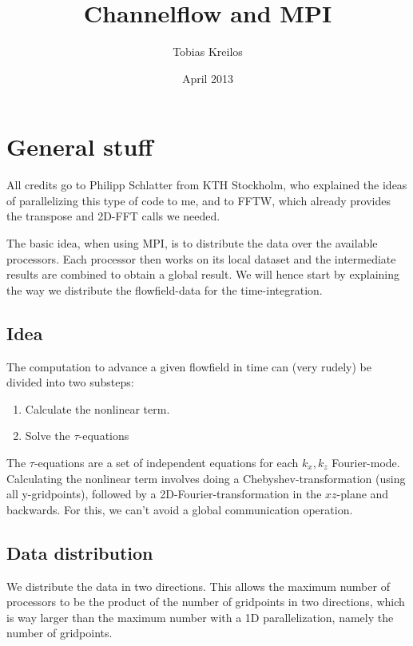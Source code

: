 \documentclass[a4paper,10pt,DIV=16]{scrartcl}
\title{Channelflow and MPI}
\author{Tobias Kreilos}
\date{April 2013}
\begin{document}
\maketitle

\section{General stuff}

	All credits go to Philipp Schlatter from KTH Stockholm, who explained the ideas of parallelizing this type of code to me, and to FFTW, which already provides the transpose and 2D-FFT calls we needed.

	The basic idea, when using MPI, is to distribute the data over the available processors. Each processor then works on its local dataset and the intermediate results are combined to obtain a global result.
	We will hence start by explaining the way we distribute the flowfield-data for the time-integration.

	\subsection{Idea}
		The computation to advance a given flowfield in time can (very rudely) be divided into two substeps:
		\begin{enumerate}
		  \item Calculate the nonlinear term.
		  \item Solve the $\tau$-equations
		\end{enumerate}
		The $\tau$-equations are a set of independent equations for each $k_x,k_z$ Fourier-mode.
		Calculating the nonlinear term involves doing a Chebyshev-transformation (using all y-gridpoints), followed by a 2D-Fourier-transformation in the $xz$-plane and backwards.
		For this, we can't avoid a global communication operation.
		
	\subsection{Data distribution}
		We distribute the data in two directions. This allows the maximum number of processors to be the product of the number of gridpoints in two directions, which is way larger than the maximum number with a 1D parallelization, namely the number of gridpoints.
		
\end{document}
